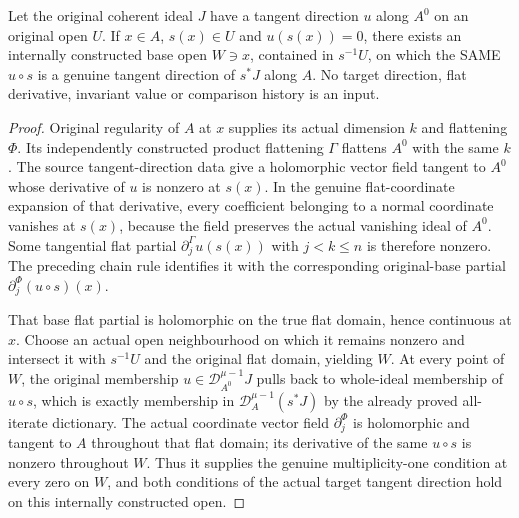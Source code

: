 \begin{theorem}
\label{hir:actual-zero-section-contact-neighbourhood}
\leanok
Let the original coherent ideal $J$ have a tangent direction $u$ along $A^0$ on an original open $U$. If $x\in A$, $s(x)\in U$ and $u(s(x))=0$, there exists an internally constructed base open $W\ni x$, contained in $s^{-1}U$, on which the SAME $u\circ s$ is a genuine tangent direction of $s^*J$ along $A$. No target direction, flat derivative, invariant value or comparison history is an input.
\end{theorem}
\begin{proof}
Original regularity of $A$ at $x$ supplies its actual dimension $k$ and flattening $\Phi$. Its independently constructed product flattening $\Gamma$ flattens $A^0$ with the same $k$. The source tangent-direction data give a holomorphic vector field tangent to $A^0$ whose derivative of $u$ is nonzero at $s(x)$. In the genuine flat-coordinate expansion of that derivative, every coefficient belonging to a normal coordinate vanishes at $s(x)$, because the field preserves the actual vanishing ideal of $A^0$. Some tangential flat partial $\partial_j^\Gamma u(s(x))$ with $j<k\le n$ is therefore nonzero. The preceding chain rule identifies it with the corresponding original-base partial $\partial_j^\Phi(u\circ s)(x)$.

That base flat partial is holomorphic on the true flat domain, hence continuous at $x$. Choose an actual open neighbourhood on which it remains nonzero and intersect it with $s^{-1}U$ and the original flat domain, yielding $W$. At every point of $W$, the original membership $u\in\mathcal D_{A^0}^{\mu-1}J$ pulls back to whole-ideal membership of $u\circ s$, which is exactly membership in $\mathcal D_A^{\mu-1}(s^*J)$ by the already proved all-iterate dictionary. The actual coordinate vector field $\partial_j^\Phi$ is holomorphic and tangent to $A$ throughout that flat domain; its derivative of the same $u\circ s$ is nonzero throughout $W$. Thus it supplies the genuine multiplicity-one condition at every zero on $W$, and both conditions of the actual target tangent direction hold on this internally constructed open.
\end{proof}


